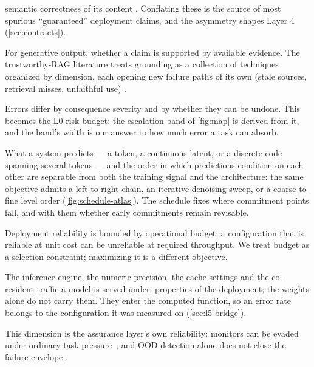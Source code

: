 \begin{description}[leftmargin=1.5em, itemsep=1pt]
semantic correctness of its content \cite{jsonschemabench2025,xgrammar2024}. Conflating
these is the source of most spurious ``guaranteed'' deployment claims, and the asymmetry
shapes Layer 4 (\cref{sec:contracts}).
\item[Grounding.] For generative output, whether a claim is supported by available evidence.
The trustworthy-RAG literature treats grounding as a collection of techniques organized by
dimension, each opening new failure paths of its own (stale sources, retrieval misses, unfaithful
use) \cite{id250206872,id240910102}.
\item[Error cost and reversibility.] Errors differ by consequence severity and by whether
they can be undone. This becomes the L0 risk budget: the escalation band of \cref{fig:map} is
derived from it, and the band's width is our answer to how much error a task can absorb.
\item[Prediction unit and generation schedule.] What a system predicts --- a token, a continuous
latent, or a discrete code spanning several tokens --- and the order in which predictions
condition on each other are separable from both the training signal and the architecture: the
same objective admits a left-to-right chain, an iterative denoising sweep, or a coarse-to-fine
level order (\cref{fig:schedule-atlas}). The schedule fixes where commitment points fall, and
with them whether early commitments remain revisable.
\item[Latency, cost and budget.] Deployment reliability is bounded by operational budget;
a configuration that is reliable at unit cost can be unreliable at required throughput. We
treat budget as a selection constraint; maximizing it is a different objective.
\item[Execution configuration.] The inference engine, the numeric precision, the cache settings
and the co-resident traffic a model is served under: properties of the deployment; the weights
alone do not carry them. They enter the computed function, so an error rate belongs to the
configuration it was measured on (\cref{sec:l5-bridge}).
\item[Monitoring and drift response.] This dimension is the assurance layer's own reliability:
monitors can be evaded under ordinary task pressure~\cite{id260930217}, and OOD detection alone
does not close the failure envelope \cite{id221116158}.
\end{description}

